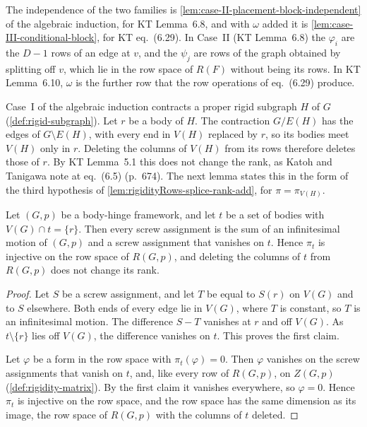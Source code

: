 The independence of the two families is
\cref{lem:case-II-placement-block-independent} of the algebraic
induction, for KT Lemma~6.8, and with $\omega$ added it is
\cref{lem:case-III-conditional-block}, for KT eq.~(6.29). In Case~II (KT Lemma~6.8) the $\varphi_i$ are the $D - 1$
rows of an edge at $v$, and the $\psi_j$ are rows of the graph obtained
by splitting off $v$, which lie in the row space of $R(F)$ without being
its rows. In KT Lemma~6.10, $\omega$ is the further row that the row
operations of eq.~(6.29) produce.

Case~I of the algebraic induction contracts a proper rigid subgraph $H$
of $G$ (\cref{def:rigid-subgraph}). Let $r$ be a body of
$H$. The contraction $G/E(H)$ has the edges of $G \setminus E(H)$, with
every end in $V(H)$ replaced by $r$, so its bodies meet $V(H)$ only in
$r$. Deleting the columns of $V(H)$ from its rows therefore deletes
those of $r$. By KT Lemma~5.1 this does not change the rank, as Katoh
and Tanigawa note at eq.~(6.5) (p.~674). The next lemma states this in
the form of the third hypothesis of
\cref{lem:rigidityRows-splice-rank-add}, for $\pi = \pi_{V(H)}$.

\begin{lemma}
  \label{lem:extProj-preserves-rank-of-inter}
  \leanok
  Let $(G,p)$ be a body-hinge framework, and let $t$ be a set of bodies
  with $V(G) \cap t = \{r\}$. Then every screw
  assignment is the sum of an infinitesimal motion of $(G,p)$ and a screw
  assignment that vanishes on $t$. Hence $\pi_t$ is injective on the row
  space of $R(G,p)$, and deleting the columns of $t$ from $R(G,p)$ does
  not change its rank.
\end{lemma}
\begin{proof}
  \leanok
  Let $S$ be a screw assignment, and let $T$ be equal to $S(r)$ on $V(G)$
  and to $S$ elsewhere. Both ends of every edge lie in $V(G)$, where $T$
  is constant, so $T$ is an infinitesimal motion. The difference $S - T$
  vanishes at $r$ and off $V(G)$. As $t \setminus \{r\}$ lies off $V(G)$,
  the difference vanishes on $t$. This proves the first claim.

  Let $\varphi$ be a form in the row space with $\pi_t(\varphi) = 0$. Then
  $\varphi$ vanishes on the screw assignments that vanish on $t$, and,
  like every row of $R(G,p)$, on $Z(G,p)$ (\cref{def:rigidity-matrix}). By
  the first claim it vanishes everywhere, so $\varphi = 0$. Hence $\pi_t$
  is injective on the row space, and the row space has the same dimension
  as its image, the row space of $R(G,p)$ with the columns of $t$
  deleted.
\end{proof}

